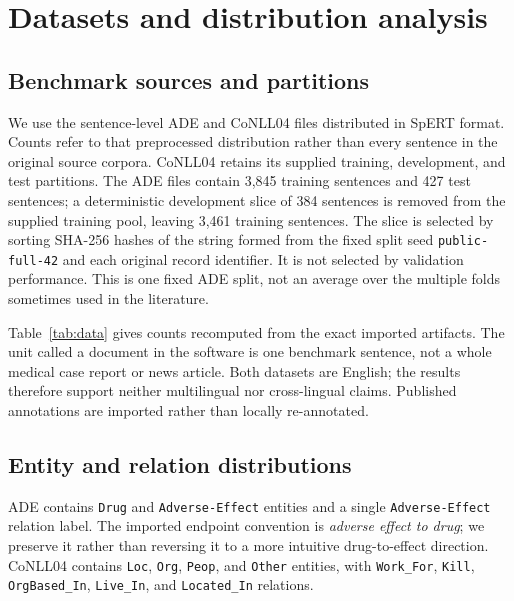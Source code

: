 \documentclass[preprint,12pt]{elsarticle}
\begin{document}
\section{Datasets and distribution analysis}
\label{sec:data}
\subsection{Benchmark sources and partitions}
We use the sentence-level ADE and CoNLL04 files distributed in SpERT format.
Counts refer to that preprocessed distribution rather than every sentence in
the original source corpora.
CoNLL04 retains its supplied training, development, and test partitions. The
ADE files contain 3,845 training sentences and 427 test sentences; a
deterministic development slice of 384 sentences is removed from the supplied
training pool, leaving 3,461 training sentences. The slice is selected by
sorting SHA-256 hashes of the string formed from the fixed split seed
\texttt{public-full-42} and each original record identifier. It is not selected
by validation performance. This is one fixed ADE split, not an average over
the multiple folds sometimes used in the literature.

Table~\ref{tab:data} gives counts recomputed from the exact imported artifacts.
The unit called a document in the software is one benchmark sentence, not a
whole medical case report or news article. Both datasets are English; the
results therefore support neither multilingual nor cross-lingual claims.
Published annotations are imported rather than locally re-annotated.

\begin{table}[htbp]
\centering\small\setlength{\tabcolsep}{4pt}
\caption{Dataset inventory for the exact experimental partitions. Length is
the number of whitespace-delimited tokens in the reconstructed source text.}
\label{tab:data}

\end{table}

\subsection{Entity and relation distributions}
ADE contains \texttt{Drug} and \texttt{Adverse-Effect} entities and a single
\texttt{Adverse-Effect} relation label. The imported endpoint convention is
\emph{adverse effect to drug}; we preserve it rather than reversing it to a
more intuitive drug-to-effect direction. CoNLL04 contains \texttt{Loc},
\texttt{Org}, \texttt{Peop}, and \texttt{Other} entities, with
\texttt{Work\_For}, \texttt{Kill}, \texttt{OrgBased\_In},
\texttt{Live\_In}, and \texttt{Located\_In} relations.
\end{document}
